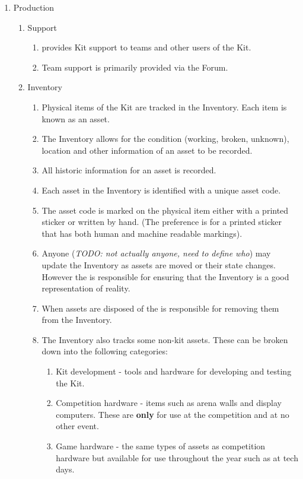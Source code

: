 \begin{draft}
\begin{enumerate}
\item Production
  \begin{enumerate}
  \item Support
    \begin{enumerate}
      \item {} provides Kit support to teams and other users of the Kit.
      \item Team support is primarily provided via the Forum.
    \end{enumerate}
  \item Inventory
    \begin{enumerate}
      \item Physical items of the Kit are tracked in the Inventory. Each item is known as an asset.
      \item The Inventory allows for the condition (working, broken, unknown), location and other information of an asset to be recorded.
      \item All historic information for an asset is recorded.
      \item Each asset in the Inventory is identified with a unique asset code.
      \item The asset code is marked on the physical item either with a printed sticker or written by hand. (The preference is for a printed sticker that has both human and machine readable markings).
      \item Anyone (\emph{TODO: not actually anyone, need to define who}) may update the Inventory as assets are moved or their state changes. However the  is responsible for ensuring that the Inventory is a good representation of reality.
      \item When assets are disposed of the  is responsible for removing them from the Inventory.
      \item The Inventory also tracks some non-kit assets. These can be broken down into the following categories:
        \begin{enumerate}
          \item Kit development - tools and hardware for developing and testing the Kit.
          \item Competition hardware - items such as arena walls and display computers. These are \textbf{only} for use at the competition and at no other event.
          \item Game hardware - the same types of assets as competition hardware but available for use throughout the year such as at tech days.

\end{enumerate}
\end{enumerate}
\end{enumerate}
\end{enumerate}
\end{draft}
